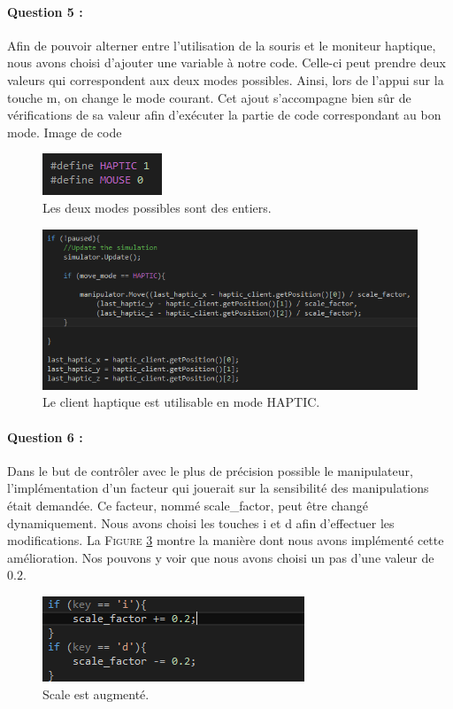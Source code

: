 \documentclass[a4paper,12pt]{article}
\begin{document}
\paragraph{Question 5 :} Afin de pouvoir alterner entre l'utilisation de la souris et le moniteur haptique, nous avons choisi d'ajouter une variable à notre code. Celle-ci peut prendre deux valeurs qui correspondent aux deux modes possibles. Ainsi, lors de l'appui sur la touche \og{}m\fg{}, on change le mode courant. Cet ajout s'accompagne bien sûr de vérifications de sa valeur afin d'exécuter la partie de code correspondant au bon mode.
 Image de code
\begin{figure}[ht!]
  \centering
  \includegraphics{images/modes.png}
  \caption{Les deux modes possibles sont des entiers.}
  \label{fig:modes}
\end{figure}

\begin{figure}[ht!]
  \centering
  \includegraphics[width=\textwidth]{images/move_mode.png}
  \caption{Le client haptique est utilisable en mode HAPTIC.}
  \label{fig:moveMode}
\end{figure}

\paragraph{Question 6 :} Dans le but de contrôler avec le plus de précision possible le manipulateur, l'implémentation d'un facteur qui jouerait sur la sensibilité des manipulations était demandée. Ce facteur, nommé \og{}scale\_factor\fg{}, peut être changé dynamiquement. Nous avons choisi les touches \og{}i\fg{} et \og{}d\fg{} afin d'effectuer les modifications. La \textsc{Figure} \ref{fig:scale} montre la manière dont nous avons implémenté cette amélioration. Nos pouvons y voir que nous avons choisi un pas d'une valeur de $0.2$.
\begin{figure}[ht!]
  \centering
  \includegraphics{images/scale.png}
  \caption{Scale est augmenté.}
  \label{fig:scale}
\end{figure}
\end{document}
